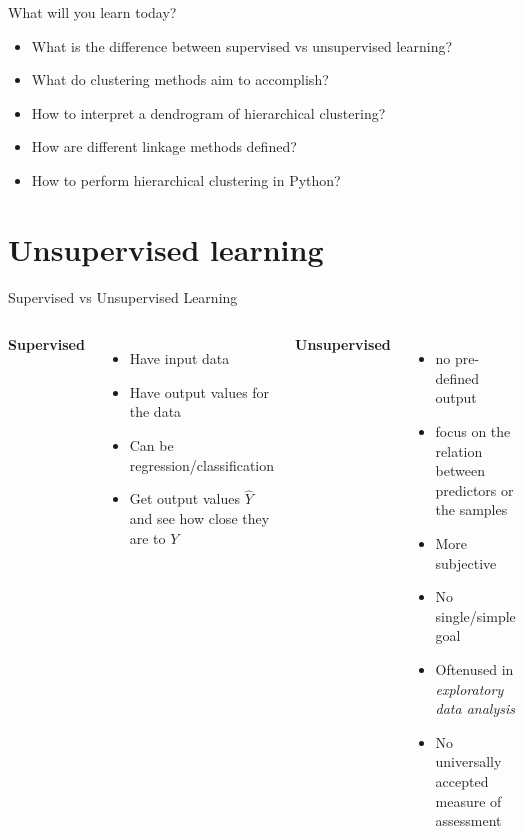 \documentclass[aspectratio=169,usenames,dvipsnames]{beamer}
\newcommand{\InstructorList}[1]{
\begin{itemize}
	\color{orange}
	#1
\end{itemize}
}
\begin{document}
\begin{frame}[t]{What will you learn today?}

\begin{itemize}
	\item What is the difference between supervised vs unsupervised learning?
	\item What do clustering methods aim to accomplish?
	\item How to interpret a dendrogram of hierarchical clustering? 
	\item How are different linkage methods defined?
	\item How to perform hierarchical clustering in Python? 
\end{itemize}

\end{frame}


\section{Unsupervised learning}


\begin{frame}[t]{Supervised vs Unsupervised Learning}

\begin{columns}
\centering
\textbf{Supervised}
\InstructorList{
  \item Have input data
	\item Have output values for the data
	\item Can be regression/classification
	\item Get output values $\hat Y$ and see how close they are to $Y$
}


\centering
\textbf{Unsupervised}

\InstructorList{
  \item no pre-defined output
  \item focus on the relation between predictors or the samples
  \item More subjective
	\item No single/simple goal
	\item Oftenused in \textit{exploratory data analysis}
	\item No universally accepted measure of assessment


}






\end{columns}

\end{frame}
\end{document}
